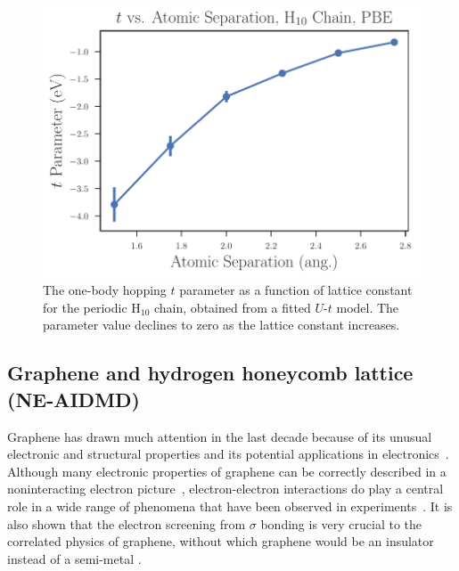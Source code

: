 \documentclass[prl,12pt,onecolumn,nofootinbib,notitlepage,english,superscriptaddress]{revtex4-1}
\begin{document}
 \begin{figure}
\centering
\includegraphics[scale=0.6]{$t$_vs_separation_h_chain_ols.pdf}
\caption{The one-body hopping $t$ parameter as a function of lattice constant for the periodic H$_{10}$ chain, obtained from a fitted $U$-$t$ model. The parameter value declines to zero as the lattice constant increases.}\label{fig:Parameters-vs-Bond-t}
 \end{figure}

\subsection{Graphene and hydrogen honeycomb lattice (NE-AIDMD)}
Graphene has drawn much attention in the last decade because of its unusual electronic and structural properties and its potential applications in electronics~\cite{Wallace1947, Novoselov2004,NovoselovNature2005, Katsnelson2006, Geim2007, Novoselov2007, neto2009, Castro2009}. 
Although many electronic properties of graphene can be correctly described in a noninteracting electron picture~\cite{Castro2009}, electron-electron interactions do play a central role in a wide range of phenomena that have been observed in experiments~\cite{Kotov2012}. It is also shown that the electron screening from $\sigma$ bonding is very crucial to the correlated physics of graphene, without which graphene would be an insulator instead of a semi-metal \cite{Zheng2016} .
\end{document}
